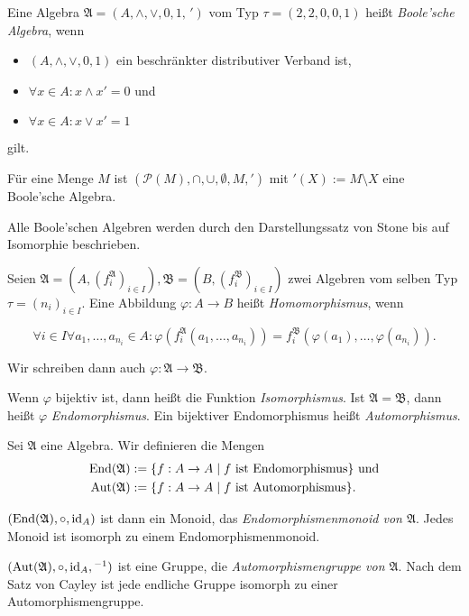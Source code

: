 \begin{definition}
    Eine Algebra $\mathfrak{A} = (A, \wedge, \vee, 0, 1, \,')$ vom Typ $\tau = (2,2,0,0,1)$ heißt \emph{Boole'sche Algebra}, wenn
    \begin{itemize}[topsep=0pt, label={--}]
        \item $(A, \wedge, \vee, 0, 1)$ ein beschränkter distributiver Verband ist,
        \item $\forall x \in A: x \wedge x' = 0$ und
        \item $\forall x \in A: x \vee x' = 1$
    \end{itemize}
    gilt.
\end{definition}

\begin{example}
    Für eine Menge $M$ ist $(\mathcal{P}(M), \cap, \cup, \emptyset, M, ')$ mit $'(X) := M \setminus X$ eine Boole'sche Algebra.
\end{example}

\begin{remark}
    Alle Boole'schen Algebren werden durch den Darstellungssatz von Stone bis auf Isomorphie beschrieben.
\end{remark}

\begin{definition}
    Seien $\mathfrak{A} = (A, (f_i^\mathfrak{A})_{i \in I}), \mathfrak{B} = (B, (f_i^\mathfrak{B})_{i \in I})$ zwei Algebren vom selben Typ $\tau = (n_i)_{i \in I}$. Eine Abbildung $\varphi: A \to B$ heißt \emph{Homomorphismus}, wenn

    $$\forall i \in I \forall a_1, \ldots, a_{n_i} \in A: \varphi(f_i^\mathfrak{A}(a_1, \ldots, a_{n_i})) = f_i^\mathfrak{B}(\varphi(a_1), \ldots, \varphi(a_{n_i})). $$

    Wir schreiben dann auch $\varphi : \mathfrak{A} \to \mathfrak{B}$.

    Wenn $\varphi$ bijektiv ist, dann heißt die Funktion \emph{Isomorphismus}.
    Ist $\mathfrak{A} = \mathfrak{B}$, dann heißt $\varphi$ \emph{Endomorphismus}. Ein bijektiver Endomorphismus heißt \emph{Automorphismus}.
\end{definition}

\begin{example}
    Sei $\mathfrak{A}$ eine Algebra. Wir definieren die Mengen \begin{align*}
        \operatorname{End}(\mathfrak{A}) &:= \{f: A \to A \mid f\text{ ist Endomorphismus}\} \text{ und} \\ \operatorname{Aut}(\mathfrak{A}) &:= \{f: A \to A \mid f\text{ ist Automorphismus}\}.
    \end{align*}

    $(\operatorname{End}(\mathfrak{A}), \circ, \operatorname{id}_A)$ ist dann ein Monoid, das \emph{Endomorphismenmonoid von $\mathfrak{A}$}. Jedes Monoid ist isomorph zu einem Endomorphismenmonoid.
    
    $(\operatorname{Aut}(\mathfrak{A}), \circ, \operatorname{id}_A, {}^{-1})$ ist eine Gruppe, die \emph{Automorphismengruppe von $\mathfrak{A}$}. Nach dem Satz von Cayley ist jede endliche Gruppe isomorph zu einer Automorphismengruppe.
\end{example}